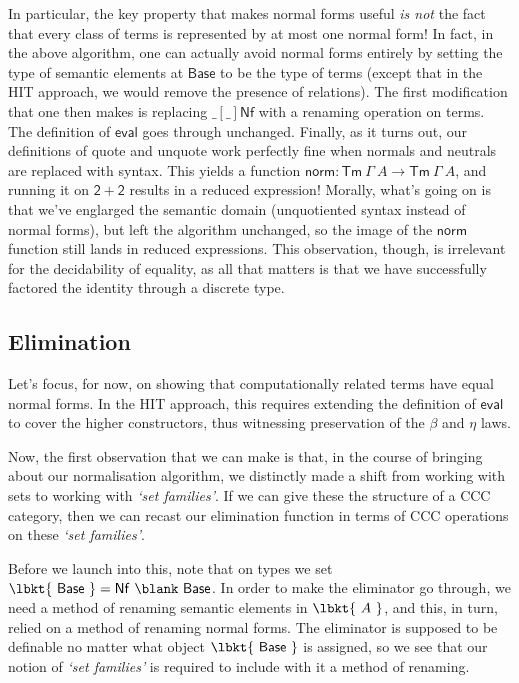 In particular, the key property that makes normal forms useful \emph{is not} the
fact that every class of terms is represented by at most one normal form! In
fact, in the above algorithm, one can actually avoid normal forms entirely by
setting the type of semantic elements at $\mathsf{Base}$ to be the type of terms
(except that in the HIT approach, we would remove the presence of relations).
The first modification that one then makes is replacing $\mathsf{\_[\_]Nf}$ with
a renaming operation on terms. The definition of $\mathsf{eval}$ goes through
unchanged. Finally, as it turns out, our definitions of quote and unquote work
perfectly fine when normals and neutrals are replaced with syntax. This yields a
function $\mathsf{norm} : \mathsf{Tm}~\Gamma~A \to \mathsf{Tm}~\Gamma~A$, and
running it on $\mathsf{2+2}$ results in a reduced expression! Morally, what's
going on is that we've englarged the semantic domain (unquotiented syntax
instead of normal forms), but left the algorithm unchanged, so the image of the
$\mathsf{norm}$ function still lands in reduced expressions. This observation,
though, is irrelevant for the decidability of equality, as all that matters is
that we have successfully factored the identity through a discrete type.

\subsection{Elimination}

Let's focus, for now, on showing that computationally related terms have equal
normal forms. In the HIT approach, this requires extending the definition of
$\mathsf{eval}$ to cover the higher constructors, thus witnessing preservation
of the $\beta$ and $\eta$ laws.

Now, the first observation that we can make is that, in the course of bringing
about our normalisation algorithm, we distinctly made a shift from working with
sets to working with \emph{`set families'}. If we can give these the structure
of a CCC category, then we can recast our elimination function in terms of
CCC operations on these \emph{`set families'}.

Before we launch into this, note that on types we set $\lbkt{~\mathsf{Base}~}
= \mathsf{Nf}~\blank~\mathsf{Base}$. In order to make the eliminator go through,
we need a method of renaming semantic elements in $\lbkt{~A~}$, and this, in
turn, relied on a method of renaming normal forms. The eliminator is supposed
to be definable no matter what object $\lbkt{~\mathsf{Base}~}$ is assigned, so
we see that our notion of \emph{`set families'} is required to include with it
a method of renaming.

